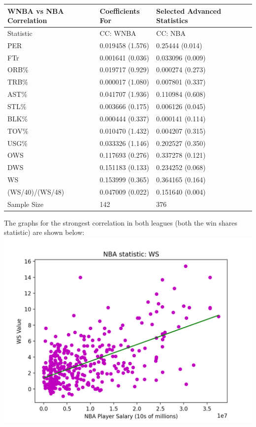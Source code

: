 \documentclass[12pt]{article}
\begin{document}
\begin{tabular}{*5l}    \toprule
WNBA vs NBA Correlation & Coefficients For & Selected Advanced Statistics \\\midrule

Statistic 
&  CC: WNBA   & CC: NBA \\ 

 PER  &  0.019458 (1.576)  & 0.25444 (0.014) \\
 FTr   &  0.001641 (0.036)  & 0.033096 (0.009)       \\ 
 ORB\%   &  0.019717 (0.929)  & 0.000274 (0.273)       \\   
 TRB\%   &  0.000017 (1.080)   & 0.007801 (0.337)       \\
 AST\%   &  0.041707 (1.936)  & 0.110984 (0.608)    \\
 STL\%  &  0.003666 (0.175)  & 0.006126 (0.045)       \\    
 BLK\%  & 0.000444 (0.337)   & 0.000141 (0.114)     \\
 TOV\%  & 0.010470 (1.432)  & 0.004207 (0.315)    \\
 USG\%   & 0.033326 (1.146)   & 0.202527 (0.350)       \\
 OWS   & 0.117693 (0.276)   & 0.337278 (0.121)        \\
 DWS  & 0.151183 (0.133)   & 0.234252 (0.068)         \\
 WS   &  0.153999 (0.365)  & 0.364165 (0.164)                 \\
 (WS/40)/(WS/48)   &  0.047009 (0.022)  & 0.151640 (0.004) \\
 \hline
 Sample Size & 142 & 376
\end{tabular}
\newline
\par
The graphs for the strongest correlation in both leagues (both the win shares statistic) are shown below:
\newline
\includegraphics[width=.85\textwidth]{NBA_WS_Graph.png}
\end{document}
